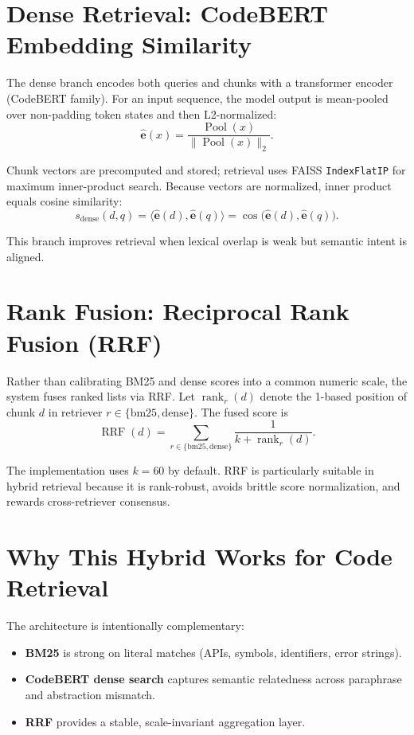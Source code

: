 \documentclass[11pt]{article}
\begin{document}
\section{Dense Retrieval: CodeBERT Embedding Similarity}
The dense branch encodes both queries and chunks with a transformer encoder (CodeBERT family). For an input sequence, the model output is mean-pooled over non-padding token states and then L2-normalized:
\begin{equation}
\hat{\mathbf{e}}(x)
= \frac{\operatorname{Pool}(x)}{\lVert \operatorname{Pool}(x) \rVert_2}.
\end{equation}

Chunk vectors are precomputed and stored; retrieval uses FAISS \texttt{IndexFlatIP} for maximum inner-product search. Because vectors are normalized, inner product equals cosine similarity:
\begin{equation}
\label{eq:dense}
s_{\text{dense}}(d,q)
= \langle \hat{\mathbf{e}}(d), \hat{\mathbf{e}}(q) \rangle
= \cos\big(\hat{\mathbf{e}}(d),\hat{\mathbf{e}}(q)\big).
\end{equation}

This branch improves retrieval when lexical overlap is weak but semantic intent is aligned.

\section{Rank Fusion: Reciprocal Rank Fusion (RRF)}
Rather than calibrating BM25 and dense scores into a common numeric scale, the system fuses ranked lists via RRF. Let $\operatorname{rank}_r(d)$ denote the 1-based position of chunk $d$ in retriever $r \in \{\text{bm25},\text{dense}\}$. The fused score is
\begin{equation}
\label{eq:rrf}
\operatorname{RRF}(d)
= \sum_{r \in \{\text{bm25},\text{dense}\}}
\frac{1}{k + \operatorname{rank}_r(d)}.
\end{equation}

The implementation uses $k=60$ by default. RRF is particularly suitable in hybrid retrieval because it is rank-robust, avoids brittle score normalization, and rewards cross-retriever consensus.

\section{Why This Hybrid Works for Code Retrieval}
The architecture is intentionally complementary:
\begin{itemize}
  \item \textbf{BM25} is strong on literal matches (APIs, symbols, identifiers, error strings).
  \item \textbf{CodeBERT dense search} captures semantic relatedness across paraphrase and abstraction mismatch.
  \item \textbf{RRF} provides a stable, scale-invariant aggregation layer.
\end{itemize}
\end{document}
